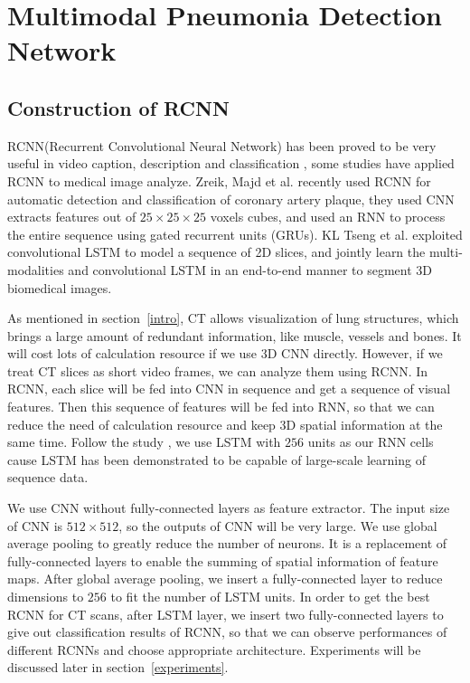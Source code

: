 \documentclass[journal]{IEEEtran}
\begin{document}
\section{Multimodal Pneumonia Detection Network }
\label{MPDNetwork}
\subsection{Construction of RCNN}
\label{RCNN}
RCNN(Recurrent Convolutional Neural Network) has been proved to be very useful in video caption, description and classification \cite{Donahue2015Long}\cite{Aafaq2019Spatio}, some studies have applied RCNN to medical image analyze. Zreik, Majd et al. \cite{Zreik2018A} recently used RCNN for automatic detection and classification of coronary artery plaque, they used CNN extracts features out of $ 25\times25\times25$ voxels cubes, and used an RNN to process the entire sequence using gated recurrent units (GRUs)\cite{chung2014empirical}. KL Tseng et al. \cite{tseng2017joint} exploited convolutional LSTM to model a sequence of 2D slices, and jointly learn the multi-modalities and convolutional LSTM in an end-to-end manner to segment 3D biomedical images.

As mentioned in section~\ref{intro}, CT allows visualization of lung structures, which brings a large amount of redundant information, like muscle, vessels and bones. It will cost lots of calculation resource if we use 3D CNN directly. However, if we treat CT slices as short video frames, we can analyze them using RCNN. In RCNN, each slice will be fed into CNN in sequence and get a sequence of visual features. Then this sequence of features will be fed into RNN, so that we can reduce the need of calculation resource and keep 3D spatial information at the same time. 
Follow the study \cite{Donahue2015Long}, we use LSTM with $256$ units as our RNN cells cause LSTM has been demonstrated to be capable of large-scale learning of sequence data. 

We use CNN without fully-connected layers as feature extractor. The input size of CNN is $512 \times 512$, so the outputs of CNN will be very large. We use global average pooling \cite{lin2014network} to greatly reduce the number of neurons. It is a replacement of fully-connected layers to enable the summing of spatial information of feature maps. After global average pooling, we insert a fully-connected layer to reduce dimensions to $256$ to fit the number of LSTM units.
In order to get the best RCNN for CT scans, after LSTM layer, we insert two fully-connected layers to give out classification results of RCNN, so that we can observe performances of different RCNNs and choose appropriate architecture. Experiments will be discussed later in section~\ref{experiments}.
\end{document}
